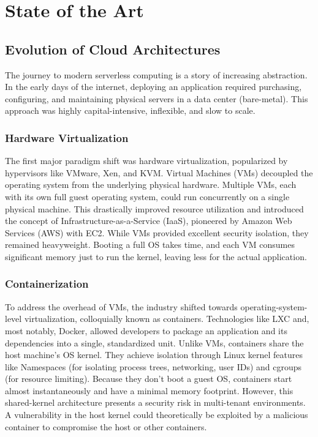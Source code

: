 \chapter{State of the Art}

\section{Evolution of Cloud Architectures}
The journey to modern serverless computing is a story of increasing abstraction. In the early days of the internet, deploying an application required purchasing, configuring, and maintaining physical servers in a data center (bare-metal). This approach was highly capital-intensive, inflexible, and slow to scale.

\subsection{Hardware Virtualization}
The first major paradigm shift was hardware virtualization, popularized by hypervisors like VMware, Xen, and KVM. Virtual Machines (VMs) decoupled the operating system from the underlying physical hardware. Multiple VMs, each with its own full guest operating system, could run concurrently on a single physical machine. This drastically improved resource utilization and introduced the concept of Infrastructure-as-a-Service (IaaS), pioneered by Amazon Web Services (AWS) with EC2. While VMs provided excellent security isolation, they remained heavyweight. Booting a full OS takes time, and each VM consumes significant memory just to run the kernel, leaving less for the actual application.

\subsection{Containerization}
To address the overhead of VMs, the industry shifted towards operating-system-level virtualization, colloquially known as containers. Technologies like LXC and, most notably, Docker, allowed developers to package an application and its dependencies into a single, standardized unit. Unlike VMs, containers share the host machine's OS kernel. They achieve isolation through Linux kernel features like Namespaces (for isolating process trees, networking, user IDs) and cgroups (for resource limiting).
Because they don't boot a guest OS, containers start almost instantaneously and have a minimal memory footprint. However, this shared-kernel architecture presents a security risk in multi-tenant environments. A vulnerability in the host kernel could theoretically be exploited by a malicious container to compromise the host or other containers.

